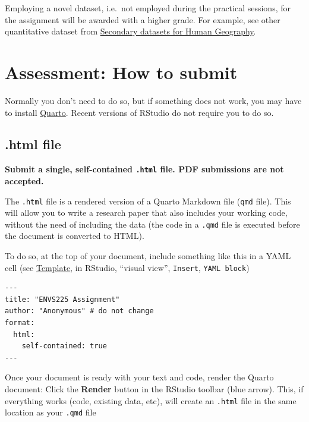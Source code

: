 \documentclass[
  letterpaper,
  DIV=11,
  numbers=noendperiod]{scrreprt}
\begin{document}
Employing a novel dataset, i.e.~not employed during the practical
sessions, for the assignment will be awarded with a higher grade. For
example, see other quantitative dataset from
\href{https://canvas.liverpool.ac.uk/courses/93312/files/14456876?module_item_id=2727716}{Secondary
datasets for Human Geography}.


\chapter*{Assessment: How to submit}\label{assessment-how-to-submit}


Normally you don't need to do so, but if something does not work, you
may have to install \href{https://quarto.org}{Quarto}. Recent versions
of RStudio do not require you to do so.

\section*{.html file}\label{html-file}


\textbf{Submit a single, self-contained \texttt{.html} file. PDF
submissions are not accepted.}

The \texttt{.html} file is a rendered version of a Quarto Markdown file
(\texttt{qmd} file). This will allow you to write a research paper that
also includes your working code, without the need of including the data
(the code in a \texttt{.qmd} file is executed before the document is
converted to HTML).

To do so, at the top of your document, include something like this in a
YAML cell (see \href{reportTemplate.qmd}{Template}, in RStudio, ``visual
view'', \texttt{Insert}, \texttt{YAML\ block})

\begin{verbatim}
---
title: "ENVS225 Assignment"
author: "Anonymous" # do not change
format:
  html:
    self-contained: true
---
\end{verbatim}

Once your document is ready with your text and code, render the Quarto
document: Click the \textbf{Render} button in the RStudio toolbar (blue
arrow). This, if everything works (code, existing data, etc), will
create an \texttt{.html} file in the same location as your \texttt{.qmd}
file
\end{document}
